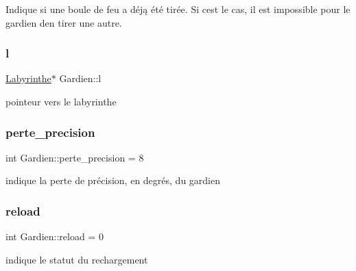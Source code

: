 Indique si une boule de feu a déją été tirée. Si c\textquotesingle{}est le cas, il est impossible pour le gardien d\textquotesingle{}en tirer une autre. 

\mbox{\label{classGardien_a6a2c6e6cba4cf4e760ee8509d72f0f98}} 
\subsubsection{\texorpdfstring{l}{l}}
{\footnotesize\ttfamily \hyperlink{classLabyrinthe}{Labyrinthe}$\ast$ Gardien\+::l\hspace{0.3cm}{\ttfamily [private]}}



pointeur vers le labyrinthe 

\mbox{\label{classGardien_a5d7e6815e221a4c2038efaf6e8ba9d2e}} 
\subsubsection{\texorpdfstring{perte\+\_\+precision}{perte\_precision}}
{\footnotesize\ttfamily int Gardien\+::perte\+\_\+precision = 8\hspace{0.3cm}{\ttfamily [private]}}



indique la perte de précision, en degrés, du gardien 

\mbox{\label{classGardien_a58cdd1f05ebd54e3f638b69e4978837d}} 
\subsubsection{\texorpdfstring{reload}{reload}}
{\footnotesize\ttfamily int Gardien\+::reload = 0\hspace{0.3cm}{\ttfamily [private]}}



indique le statut du rechargement 

\mbox{\label{classGardien_a9848c409574b185b566caa7b9c900ae7}} 
